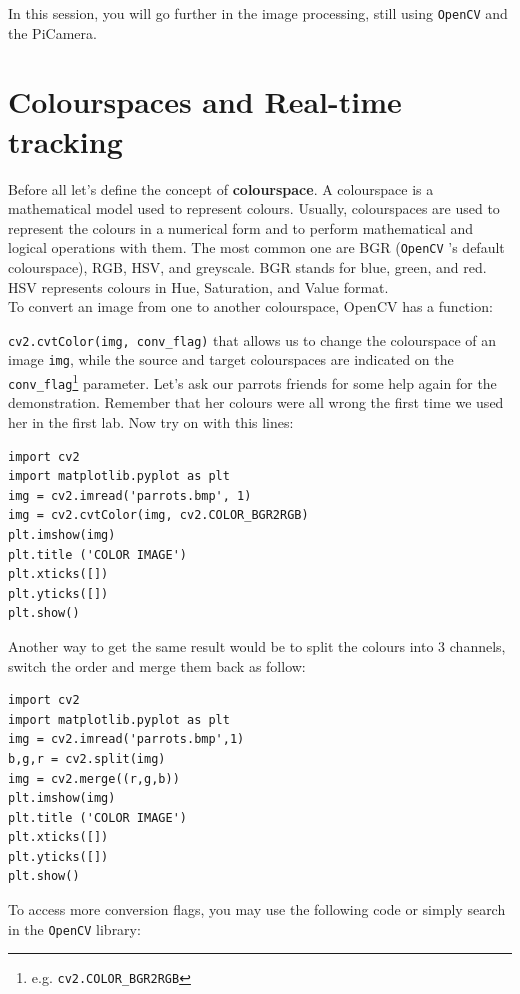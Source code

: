 \documentclass{labo}
\author{}
\newcommand{\opencv}{\texttt{OpenCV} }
\begin{document}

In this session, you will go further in the image processing, still using \opencv and the PiCamera.

\section*{Colourspaces and Real-time tracking}
Before all let’s define the concept of \textbf{colourspace}. A colourspace is a mathematical model used to
represent colours. Usually, colourspaces are used to represent the colours in a numerical form and to
perform mathematical and logical operations with them. The most common one are BGR (\opencv's
default colourspace), RGB, HSV, and greyscale. BGR stands for blue, green, and red. HSV represents
colours in Hue, Saturation, and Value format.\\

To convert an image from one to another colourspace, OpenCV has a function:

\texttt{cv2.cvtColor(img, conv\_flag)} that allows us to change the colourspace of an image \texttt{img}, while the source and target colourspaces are indicated on the \texttt{conv\_flag}\footnote{e.g. \texttt{cv2.COLOR\_BGR2RGB}} parameter. Let’s ask our parrots friends for some help again for the demonstration. Remember that her colours were all wrong the first time we used her in the first lab.
Now try on with this lines:

\begin{verbatim}
import cv2
import matplotlib.pyplot as plt
img = cv2.imread('parrots.bmp', 1)
img = cv2.cvtColor(img, cv2.COLOR_BGR2RGB)
plt.imshow(img)
plt.title ('COLOR IMAGE')
plt.xticks([])
plt.yticks([])
plt.show()
\end{verbatim}

Another way to get the same result would be to split the colours into 3 channels, switch the order and merge them back as follow:

\begin{verbatim}
import cv2
import matplotlib.pyplot as plt
img = cv2.imread('parrots.bmp',1)
b,g,r = cv2.split(img)
img = cv2.merge((r,g,b))
plt.imshow(img)
plt.title ('COLOR IMAGE')
plt.xticks([])
plt.yticks([])
plt.show()
\end{verbatim}

To access more conversion flags, you may use the following code or simply search in the \opencv library:
\end{document}
